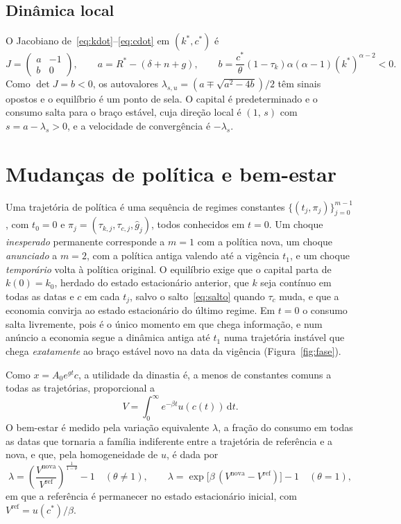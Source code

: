 \documentclass[11pt,a4paper]{article}
\newcommand{\dd}{\,\mathrm{d}}
\begin{document}
\subsection{Dinâmica local}
O Jacobiano de~\eqref{eq:kdot}--\eqref{eq:cdot} em $(k^*,c^*)$ é
\begin{equation}
 J=\begin{pmatrix} a&-1\\ b&0\end{pmatrix},\qquad
 a=R^*-(\delta+n+g),\qquad
 b=\frac{c^*}{\theta}(1-\tau_k)\alpha(\alpha-1)(k^*)^{\alpha-2}<0.
 \label{eq:jacobiano}
\end{equation}
Como $\det J=b<0$, os autovalores $\lambda_{s,u}=(a\mp\sqrt{a^2-4b})/2$ têm
sinais opostos e o equilíbrio é um ponto de sela. O capital é predeterminado e
o consumo salta para o braço estável, cuja direção local é $(1,\,s)$ com
$s=a-\lambda_s>0$, e a velocidade de convergência é $-\lambda_s$.

\section{Mudanças de política e bem-estar}
\label{sec:politica}

Uma trajetória de política é uma sequência de regimes constantes
$\{(t_j,\pi_j)\}_{j=0}^{m-1}$, com $t_0=0$ e $\pi_j=(\tau_{k,j},\tau_{c,j},\hat g_j)$,
todos conhecidos em $t=0$. Um choque \emph{inesperado} permanente corresponde
a $m=1$ com a política nova, um choque \emph{anunciado} a $m=2$, com a
política antiga valendo até a vigência $t_1$, e um choque \emph{temporário}
volta à política original. O equilíbrio exige que o capital parta de
$k(0)=k_0$, herdado do estado estacionário anterior, que $k$ seja contínuo em
todas as datas e $c$ em cada $t_j$, salvo o salto~\eqref{eq:salto} quando
$\tau_c$ muda, e que a economia convirja ao estado estacionário do último
regime. Em $t=0$ o consumo salta livremente, pois é o único momento em que
chega informação, e num anúncio a economia segue a dinâmica antiga até $t_1$
numa trajetória instável que chega \emph{exatamente} ao braço estável novo na
data da vigência (Figura~\ref{fig:fase}).

Como $x=A_0e^{gt}c$, a utilidade da dinastia é, a menos de constantes comuns
a todas as trajetórias, proporcional a
\begin{equation}
 V=\int_0^\infty e^{-\beta t}u(c(t))\dd t.
 \label{eq:valor}
\end{equation}
O bem-estar é medido pela variação equivalente $\lambda$, a fração do consumo
em todas as datas que tornaria a família indiferente entre a trajetória de
referência e a nova, e que, pela homogeneidade de $u$, é dada por
\begin{equation}
 \lambda=\left(\frac{V^{\text{nova}}}{V^{\text{ref}}}\right)^{\frac1{1-\theta}}-1
 \quad(\theta\neq1),
 \qquad
 \lambda=\exp\bigl[\beta\,(V^{\text{nova}}-V^{\text{ref}})\bigr]-1
 \quad(\theta=1),
 \label{eq:lambda}
\end{equation}
em que a referência é permanecer no estado estacionário inicial, com
$V^{\text{ref}}=u(c^*)/\beta$.
\end{document}
